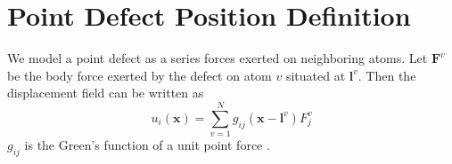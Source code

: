 \documentclass[%
 reprint,
 amsmath,amssymb,
 aps,
]{revtex4-1}
\begin{document}
%
%
%
%

\appendix
\section{Point Defect Position Definition}
\label{app:position}
We model a point defect as a series forces exerted on neighboring atoms.
Let $\bm{F}^{v}$ be the body force exerted by the defect on atom $v$ situated at $\bm{l}^v$.
Then the displacement field can be written as
\begin{equation}
u_i(\bm{x}) = \sum_{v=1}^{N} g_{ij}(\bm{x}-\bm{l}^v) F_j^v
\end{equation}
$g_{ij}$ is the Green's function of a unit point force \cite{seifmultipolar,ting1997three}.
\end{document}
